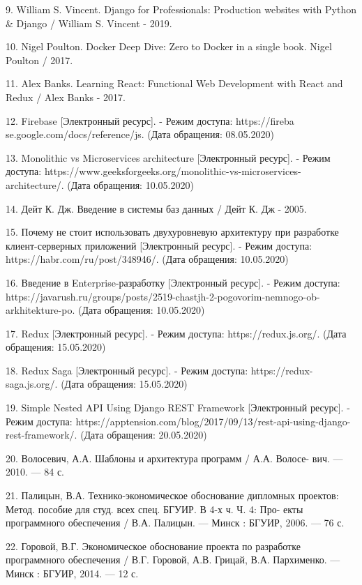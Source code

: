 9. William S. Vincent. Django for Professionals: Production websites with Python \& Django / William S. Vincent - 2019.

10. Nigel Poulton. Docker Deep Dive: Zero to Docker in a single book. Nigel Poulton / 2017.

11. Alex Banks. Learning React: Functional Web Development with React and Redux / Alex Banks - 2017.

12. Firebase [Электронный ресурс]. - Режим доступа: https://fireba  \linebreak se.google.com/docs/reference/js. (Дата обращения: 08.05.2020)

13. Monolithic vs Microservices architecture [Электронный ресурс]. - Режим доступа: https://www.geeksforgeeks.org/monolithic-vs-microservices-\\architecture/. (Дата обращения: 10.05.2020)

14. Дейт К. Дж. Введение в системы баз данных / Дейт К. Дж - 2005.

15. Почему не стоит использовать двухуровневую архитектуру при разработке клиент-серверных приложений [Электронный ресурс]. - Режим доступа: https://habr.com/ru/post/348946/. (Дата обращения: 10.05.2020)

16. Введение в Enterprise-разработку [Электронный ресурс]. - Режим доступа: https://javarush.ru/groups/posts/2519-chastjh-2-pogovorim-nemnogo-ob-arkhitekture-po. (Дата обращения: 10.05.2020)

17. Redux [Электронный ресурс]. - Режим доступа: https://redux.js.org/. (Дата обращения: 15.05.2020)

18. Redux Saga [Электронный ресурс]. - Режим доступа: https://redux-saga.js.org/. (Дата обращения: 15.05.2020)

19. Simple Nested API Using Django REST Framework [Электронный ресурс]. - Режим доступа: https://apptension.com/blog/2017/09/13/rest-api-using-django-rest-framework/. (Дата обращения: 20.05.2020)

20. Волосевич, А.А. Шаблоны и архитектура программ / А.А. Волосе- вич. — 2010. — 84 с.

21. Палицын, В.А. Технико-экономическое обоснование дипломных проектов: Метод. пособие для студ. всех спец. БГУИР. В 4-х ч. Ч. 4: Про- екты программного обеспечения / В.А. Палицын. — Минск : БГУИР, 2006. — 76 с.

22. Горовой, В.Г. Экономическое обоснование проекта по разработке программного обеспечения / В.Г. Горовой, А.В. Грицай, В.А. Пархименко. — Минск : БГУИР, 2014. — 12 с.
